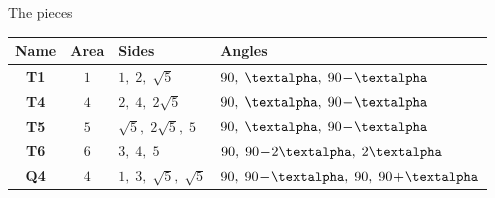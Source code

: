 \documentclass[14pt]{beamer}
\begin{document}
\begin{frame}{The pieces}
\begin{center}
            {\footnotesize
            \begin{tabular}{c|c|l|l}
                \;\;\textbf{Name}\;\; & \;\;\textbf{Area}\;\; & \;\;\textbf{Sides}          & \;\;\textbf{Angles} \\ \hline
                \textbf{T1}   & $1$           & \;\;$1,\; 2,\; \sqrt{5}$          & \;\;$90,\; \text{\textalpha},\; 90\!-\!\text{\textalpha}$   \\ \hline
                \textbf{T4}   & $4$           & \;\;$2,\; 4,\; 2\sqrt{5}$         & \;\;$90,\; \text{\textalpha},\; 90\!-\!\text{\textalpha}$   \\ \hline
                \textbf{T5}   & $5$           & \;\;$\sqrt{5},\; 2\sqrt{5},\; 5$  & \;\;$90,\; \text{\textalpha},\; 90\!-\!\text{\textalpha}$   \\ \hline
                \textbf{T6}   & $6$           & \;\;$3,\; 4,\; 5$                 & \;\;$90,\; 90\!-\!2\text{\textalpha},\; 2\text{\textalpha}$ \\ \hline
                \textbf{Q4}   & $4$           & \;\;$1,\; 3,\; \sqrt{5},\; \sqrt{5}$\;\; & \;\;$90,\; 90\!-\!\text{\textalpha},\; 90,\; 90\!+\!\text{\textalpha}$\;\; 
            \end{tabular}}
        \end{center}
    \end{frame}
    
\end{document}
